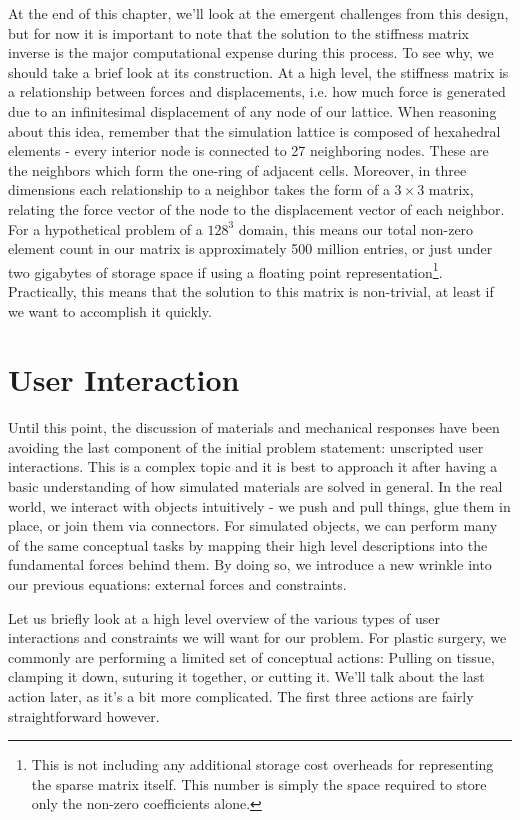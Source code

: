   At the end of this chapter, we'll look at the emergent challenges
  from this design, but for now it is important to note that the
  solution to the stiffness matrix inverse is the major computational
  expense during this process. To see why, we should take a brief look
  at its construction. At a high level, the stiffness matrix is a
  relationship between forces and displacements, i.e. how much force
  is generated due to an infinitesimal displacement of any node of our
  lattice. When reasoning about this idea, remember that the
  simulation lattice is composed of hexahedral elements - every
  interior node is connected to 27 neighboring nodes. These are the
  neighbors which form the one-ring of adjacent cells. Moreover, in
  three dimensions each relationship to a neighbor takes the form of a
  $3 \times 3$ matrix, relating the force vector of the node to the
  displacement vector of each neighbor. For a hypothetical problem of
  a $128^3$ domain, this means our total non-zero element count in our
  matrix is approximately 500 million entries, or just under two
  gigabytes of storage space if using a floating point
  representation\footnote{This is not including any additional storage
    cost overheads for representing the sparse matrix itself. This
    number is simply the space required to store only the non-zero
    coefficients alone.}. Practically, this means that the solution to
  this matrix is non-trivial, at least if we want to accomplish it
  quickly.

  \section{User Interaction}

  Until this point, the discussion of materials and mechanical
  responses have been avoiding the last component of the initial
  problem statement: unscripted user interactions. This is a complex
  topic and it is best to approach it after having a basic
  understanding of how simulated materials are solved in general. In
  the real world, we interact with objects intuitively - we push and
  pull things, glue them in place, or join them via connectors. For
  simulated objects, we can perform many of the same conceptual tasks
  by mapping their high level descriptions into the fundamental forces
  behind them. By doing so, we introduce a new wrinkle into
  our previous equations: external forces and constraints.

  Let us briefly look at a high level overview of the various types of
  user interactions and constraints we will want for our problem. For
  plastic surgery, we commonly are performing a limited set of
  conceptual actions: Pulling on tissue, clamping it down, suturing
  it together, or cutting it. We'll talk about the last action later,
  as it's a bit more complicated. The first three actions are fairly
  straightforward however.

